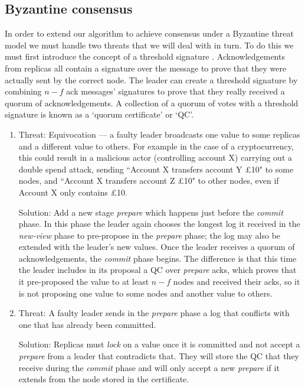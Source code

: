 \subsection{Byzantine consensus}
In order to extend our algorithm to achieve consensus under a Byzantine threat model we must handle two threats that we will deal with in turn. To do this we must first introduce the concept of a threshold signature \cite{goos_practical_2000}\cite{cachin_random_2005}. Acknowledgements from replicas all contain a signature over the message to prove that they were actually sent by the correct node. The leader can create a threshold signature by combining $n - f$ ack messages' signatures to prove that they really received a quorum of acknowledgements. A collection of a quorum of votes with a threshold signature is known as a `quorum certificate' or `QC'.

\begin{enumerate}
\item Threat: Equivocation --- a faulty leader broadcasts one value to some replicas and a different value to others. For example in the case of a cryptocurrency, this could result in a malicious actor (controlling account X) carrying out a double spend attack, sending ``Account X transfers account Y £10" to some nodes, and ``Account X transfers account Z £10" to other nodes, even if Account X only contains £10.

Solution: Add a new stage \textit{prepare} which happens just before the \textit{commit} phase. In this phase the leader again chooses the longest log it received in the \textit{new-view} phase to pre-propose in the \textit{prepare} phase; the log may also be extended with the leader's new values. Once the leader receives a quorum of acknowledgements, the \textit{commit} phase begins. The difference is that this time the leader includes in its proposal a QC over \textit{prepare} acks, which proves that it pre-proposed the value to at least $n - f$ nodes and received their acks, so it is not proposing one value to some nodes and another value to others.

\item Threat: A faulty leader sends in the \textit{prepare} phase a log that conflicts with one that has already been committed.

Solution: Replicas must \textit{lock} on a value once it is committed and not accept a \textit{prepare} from a leader that contradicts that. They will store the QC that they receive during the \textit{commit} phase and will only accept a new \textit{prepare} if it extends from the node stored in the certificate.
\end{enumerate}

